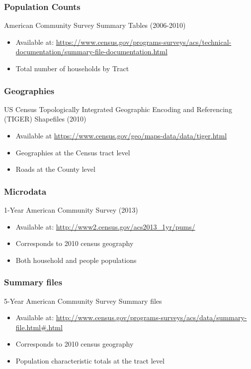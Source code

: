 \documentclass{article}
\begin{document}
\subsubsection{Population Counts}
American Community Survey Summary Tables (2006-2010) \cite{2010sf}
\begin{itemize}
	\item Available at: \url{https://www.census.gov/programs-surveys/acs/technical-documentation/summary-file-documentation.html}
	\item Total number of households by Tract 
\end{itemize}

\subsubsection{Geographies}
US Census Topologically Integrated Geographic Encoding and Referencing (TIGER) Shapefiles (2010) \cite{ustiger2010}
\begin{itemize}
	\item Available at \url{https://www.census.gov/geo/maps-data/data/tiger.html}
	\item Geographies at the Census tract level
	\item Roads at the County level
\end{itemize}

\subsubsection{Microdata}
1-Year American Community Survey (2013) \cite{1yearuspums2013}
\begin{itemize}
	\item Available at: \url{http://www2.census.gov/acs2013_1yr/pums/}
	\item Corresponds to 2010 census geography 
	\item Both household and people populations
\end{itemize}

\subsubsection{Summary files}
5-Year American Community Survey Summary files \cite{2010sf}
\begin{itemize}
	\item Available at: \url{http://www.census.gov/programs-surveys/acs/data/summary-file.html#.html}
	\item Corresponds to 2010 census geography
	\item Population characteristic totals at the tract level 
\end{itemize}
\end{document}
